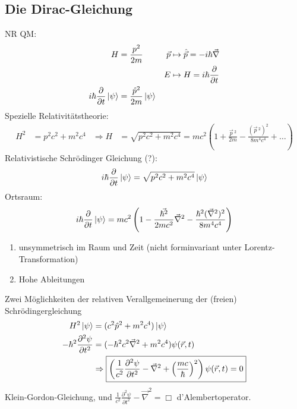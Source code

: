 \subsection{Die Dirac-Gleichung}
NR QM:
	\begin{align*}
		H &= \frac{p^2}{2m} 
		& \vec{p} &\mapsto \hat{\vec{p}} = -i \hbar \vec{\nabla} \\
		& & E &\mapsto H = i \hbar \frac{\partial}{\partial t} \\
		i \hbar \frac{\partial}{\partial t} \ket{\psi} 
		&= \frac{\hat{p}^2}{2m} \ket{\psi} 
	\end{align*}
Spezielle Relativitätstheorie:
	\begin{align*}
		H^2 &= p^2 c^2 + m^2 c^4 
		&\Rightarrow H &= \sqrt{p^2c^2 +m^2 c^4} 
		= mc^2\left(1 + \frac{\vec{p}\,^2}{2m} - \frac{(\vec{p}\,^2)^2}{8 m^4 c^4} + \ldots\right)
	\end{align*}
Relativistische Schrödinger Gleichung (?):
	\begin{align*}
		i \hbar \frac{\partial}{\partial t} \ket{\psi} 
		= \sqrt{p^2c^2 +m^2 c^4} \ket{\psi}
	\end{align*}
Ortsraum:
	\begin{align*}
		i \hbar \frac{\partial}{\partial t} \ket{\psi} 
		= mc^2 \left(1 - \frac{\vec{\hbar^2}}{2mc^2}\vec{\nabla}^2 - \frac{\hbar^2(\vec{\nabla}^2)^2}{8 m^4 c^4}\right)
	\end{align*}
	\begin{enumerate}
		\item unsymmetrisch im Raum und Zeit (nicht forminvariant unter Lorentz-Transformation)
		\item Hohe Ableitungen
	\end{enumerate}
Zwei Möglichkeiten der relativen Verallgemeinerung der (freien) Schrödingergleichung 
	\begin{align*}
		H^2 \ket{\psi} &= (c^2 \hat{p}^2 + m^2 c^4) \ket{\psi} \\
		-\hbar^2 \frac{\partial^2 \psi}{\partial t^2}
		&= (-\hbar^2 c^2 \vec{\nabla}^2 + m^2 c^4) \psi (\vec{r} , t) \\
		&\Rightarrow
		\boxed{
			\left(
			\frac{1}{c^2} \frac{\partial^2 \psi}{\partial t^2} - \vec{\nabla}^2 
			+ \left(\frac{mc}{\hbar}\right)^2
			\right)
			\psi (\vec{r} , t) = 0
		}
	\end{align*} 
Klein-Gordon-Gleichung, und $\frac{1}{c^2} \frac{\partial^2 \psi}{\partial t^2} - \vec{\nabla}^2 = \Box$ d'Alembertoperator.

